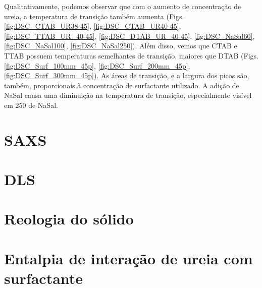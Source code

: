 		
		Qualitativamente, podemos observar que com o aumento de concentração de ureia, a temperatura de transição também aumenta (Figs. \ref{fig:DSC_CTAB_UR38-45}, \ref{fig:DSC_CTAB_UR40-45}, \ref{fig:DSC_TTAB_UR_40-45}, \ref{fig:DSC_DTAB_UR_40-45}, \ref{fig:DSC_NaSal60}, \ref{fig:DSC_NaSal100}, \ref{fig:DSC_NaSal250}). Além disso, vemos que CTAB e TTAB possuem temperaturas semelhantes de transição, maiores que DTAB (Figs. \ref{fig:DSC_Surf_100mm_45p}, \ref{fig:DSC_Surf_200mm_45p}, \ref{fig:DSC_Surf_300mm_45p}). As áreas de transição, e a largura dos picos são, também, proporcionais à concentração de surfactante utilizado. A adição de NaSal causa uma diminuição na temperatura de transição, especialmente visível em 250\mM{} de NaSal.
		
	\section{SAXS}
	\section{DLS}
	\section{Reologia do sólido}
	\section{Entalpia de interação de ureia com surfactante}